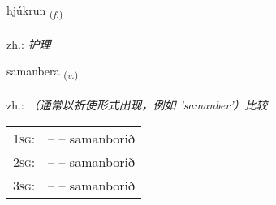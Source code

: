\documentclass[frontgrid, backgrid]{flacards}\usepackage[]{graphicx}\usepackage[]{xcolor}
\begin{document}
\renewcommand{\flhead}{\vskip5pt \fboxsep=0pt {\small\bfseries\footnotesize Nafnorð | 名词}}
\renewcommand{\fcfoot}{\vskip5pt \fboxsep=0pt \hspace{2pt}{\small\bfseries\footnotesize 3K}}

\renewcommand{\blhead}{\vskip5pt {\small\bfseries\footnotesize Nafnorð | 名词 }}
\renewcommand{\bcfoot}{\vskip5pt \hspace{2pt}{\small\bfseries\footnotesize 3K}}


{hjúkrun \small{\textsubscript{(\textit{f.})}} \\[1ex] %
\textphonetic{[çuːkrʏn]} \\
zh.: \emph{护理} \\  [2ex]
\renewcommand*{\arraystretch}{0.8}
}

\renewcommand{\flhead}{\vskip5pt \fboxsep=0pt {\small\bfseries\footnotesize Sagnorð | 动词}}
\renewcommand{\fcfoot}{\vskip5pt \fboxsep=0pt \hspace{2pt}{\small\bfseries\footnotesize 3K}}

\renewcommand{\blhead}{\vskip5pt {\small\bfseries\footnotesize Sagnorð | 动词 }}
\renewcommand{\bcfoot}{\vskip5pt \hspace{2pt}{\small\bfseries\footnotesize 3K}}


{samanbera \small{\textsubscript{(\textit{v.})}} \\[1ex] %
\textphonetic{[saːmanpɛra]} \\
zh.: \emph{（通常以祈使形式出现，例如 'samanber'）比较} \\  [2ex]
\renewcommand*{\arraystretch}{0.8}
\begin{tabular}{p{1cm}l}
\textsc{1sg}: &  --  -- samanborið \\ 
\textsc{2sg}: &  --  -- samanborið \\ 
\textsc{3sg}: &  --  -- samanborið \\ 
\end{tabular}
}
\end{document}
